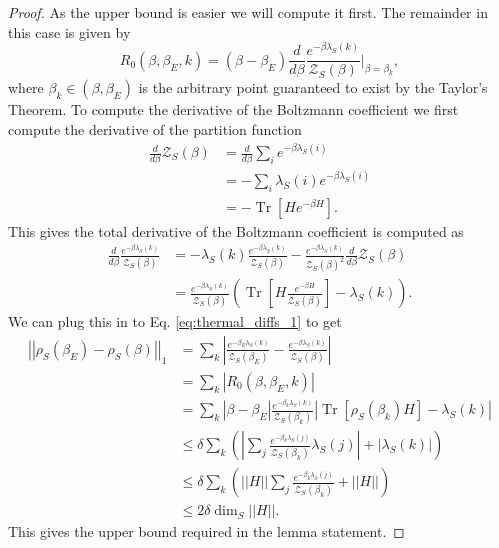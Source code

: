 \documentclass{article}
\newcommand{\parens}[1]{\left( #1 \right)}
\newcommand{\brackets}[1]{\left[ #1 \right]}
\newcommand{\abs}[1]{\left| #1 \right|}
\newcommand{\norm}[1]{\left| \left| #1 \right| \right|}
\DeclareMathOperator{\Tr}{Tr}
\newcommand{\trace}[1]{\Tr \brackets{ #1 }}
\newcommand{\partfun}{\mathcal{Z}}
\begin{document}
\begin{proof}
    As the upper bound is easier we will compute it first. The remainder in this case is given by
    \begin{equation}
        R_0(\beta, \beta_E, k) = (\beta - \beta_E) \frac{d}{d\beta} \frac{e^{-\beta \lambda_S(k)}}{\partfun_S(\beta)} \bigg|_{\beta = \beta_{k}},
    \end{equation}
    where $\beta_{k} \in (\beta, \beta_E)$ is the arbitrary point guaranteed to exist by the Taylor's Theorem. To compute the derivative of the Boltzmann coefficient we first compute the derivative of the partition function
    \begin{align}
        \frac{d}{d\beta} \partfun_S(\beta) &= \frac{d}{d\beta} \sum_i e^{-\beta \lambda_S(i)} \\
        &= - \sum_i \lambda_S(i) e^{-\beta \lambda_S(i)} \\
        &= - \trace{H e^{-\beta H}}.
    \end{align}
    This gives the total derivative of the Boltzmann coefficient is computed as
    \begin{align}
        \frac{d}{d \beta}\frac{e^{-\beta \lambda_S(k)}}{\partfun_S(\beta)} &= - \lambda_S(k) \frac{e^{-\beta \lambda_S(k)}}{\partfun_S(\beta)} - \frac{e^{-\beta \lambda_S(k)}}{\partfun_S(\beta)^2} \frac{d}{d\beta}\partfun_S(\beta) \\
        &= \frac{e^{-\beta \lambda_S(k)}}{\partfun_S(\beta)} \parens{\trace{H \frac{e^{-\beta H}}{\partfun_S(\beta)}} - \lambda_S(k)}. \label{eq:boltzmann_derivative}
    \end{align}
    We can plug this in to Eq. \eqref{eq:thermal_diffs_1} to get
    \begin{align}
        \norm{\rho_S(\beta_E) - \rho_S(\beta)}_1 &= \sum_k \abs{\frac{e^{-\beta_E \lambda_S(k)}}{\partfun_S(\beta_E)} - \frac{e^{-\beta \lambda_S(k)}}{\partfun_S(\beta)}} \\
        &= \sum_k \abs{R_0(\beta, \beta_E, k)} \\
        &= \sum_k \abs{\beta - \beta_E} \frac{e^{-\beta_{k} \lambda_S(k)}}{\partfun_S(\beta_{k})} \abs{\trace{\rho_S(\beta_{k})H} - \lambda_S(k)} \\
        &\leq \delta \sum_k \parens{\abs{\sum_{j} \frac{e^{-\beta_k \lambda_S(j)}}{\partfun_S(\beta_k)} \lambda_S(j)} + |\lambda_S(k)|} \\
        &\leq \delta \sum_k \parens{\norm{H} \sum_j \frac{e^{-\beta_k \lambda_S(j)}}{\partfun_S(\beta_k)} + \norm{H}} \\
        &\leq 2 \delta \dim_S \norm{H}.
    \end{align}
    This gives the upper bound required in the lemma statement.


\end{proof}
\end{document}
